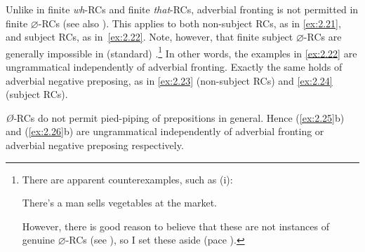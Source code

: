 \documentclass[output=paper]{langsci/langscibook}
\begin{document}
Unlike in finite \emph{wh}{-\glspl{RC} and finite} \emph{that}{-RCs, adverbial
fronting is not permitted in finite}
$\varnothing$-\glspl{RC} (see also \citealt{Doherty1993,Doherty2000}). This applies to both
non-subject RCs, as in \eqref{ex:2.21}, and subject RCs, as
in~\eqref{ex:2.22}. Note, however, that finite subject
$\varnothing${-\glspl{RC} are} generally impossible in (standard)
.\footnote{There are apparent counterexamples, such as (i):

    \begin{exe}
          There’s a man sells vegetables at the market.
    \end{exe}

However, there is good reason to believe that these are not instances of
genuine $\varnothing$-\glspl{RC} (see
\citealt{denDikken2005,Harris1980,Henry1995,Lambrecht1988,McCawley1998}),
so I set these aside (pace \citealt{Doherty1993,Doherty2000}).} In other
words, the examples in \eqref{ex:2.22} are ungrammatical independently of adverbial
fronting. Exactly the same holds of adverbial negative preposing, as in \eqref{ex:2.23}
(non-subject RCs) and \eqref{ex:2.24} (subject RCs).

\ea\label{ex:2.21}
    \z
\ex\label{ex:2.22}
    \z
\ex\label{ex:2.23}
    \z
\ex\label{ex:2.24}
    \z
\z
\emph{Ø-}RCs do not permit pied-piping of prepositions in general. Hence (\ref{ex:2.25}b)
and (\ref{ex:2.26}b) are ungrammatical independently of adverbial fronting or adverbial
negative preposing respectively.

\ea\label{ex:2.25}
    \z
\ex\label{ex:2.26}
    \z
\z
\end{document}
